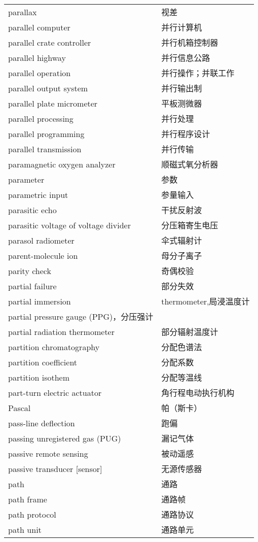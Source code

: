 \documentclass[
]{article}
\begin{document}
\begin{longtable}[]{@{}ll@{}}
parallax & 视差 \\
parallel computer & 并行计算机 \\
parallel crate controller & 并行机箱控制器 \\
parallel highway & 并行信息公路 \\
parallel operation & 并行操作；并联工作 \\
parallel output system & 并行输出制 \\
parallel plate micrometer & 平板测微器 \\
parallel processing & 并行处理 \\
parallel programming & 并行程序设计 \\
parallel transmission & 并行传输 \\
paramagnetic oxygen analyzer & 顺磁式氧分析器 \\
parameter & 参数 \\
parametric input & 参量输入 \\
parasitic echo & 干扰反射波 \\
parasitic voltage of voltage divider & 分压箱寄生电压 \\
parasol radiometer & 伞式辐射计 \\
parent-molecule ion & 母分子离子 \\
parity check & 奇偶校验 \\
partial failure & 部分失效 \\
partial immersion & thermometer,局浸温度计 \\
partial pressure gauge (PPG)，分压强计 & \\
partial radiation thermometer & 部分辐射温度计 \\
partition chromatography & 分配色谱法 \\
partition coefficient & 分配系数 \\
partition isothem & 分配等温线 \\
part-turn electric actuator & 角行程电动执行机构 \\
Pascal & 帕（斯卡） \\
pass-line deflection & 跑偏 \\
passing unregistered gas (PUG) & 漏记气体 \\
passive remote sensing & 被动遥感 \\
passive transducer {[}sensor{]} & 无源传感器 \\
path & 通路 \\
path frame & 通路帧 \\
path protocol & 通路协议 \\
path unit & 通路单元 \\

\end{longtable}
\end{document}
